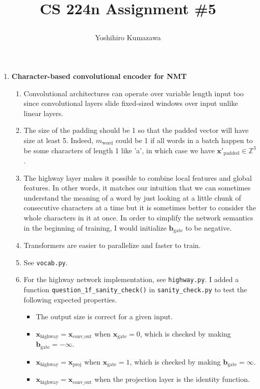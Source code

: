 \documentclass[12pt]{article}
\title{
  \vspace{-2cm}
  CS 224n Assignment \#5 \\
  \author{Yoshihiro Kumazawa}
}
\begin{document}
\maketitle
\begin{enumerate}[label=\textbf{\arabic*.}]
  \item \textbf{Character-based convolutional encoder for NMT}
  \begin{enumerate}[label=(\alph*)]
    \item Convolutional architectures can operate over variable length input too since convolutional layers slide fixed-sized windows over input unlike linear layers.
    \item The size of the padding should be 1 so that the padded vector will have size at least 5. Indeed, $m_\text{word}$ could be 1 if all words in a batch happen to be some characters of length 1 like 'a', in which case we have $\mathbf{x}'_\text{padded}\in\mathbb{Z}^3$.
    \item The highway layer makes it possible to combine local features and global features. In other words, it matches our intuition that we can sometimes understand the meaning of a word by just looking at a little chunk of consecutive characters at a time but it is sometimes better to consider the whole characters in it at once. In order to simplify the network semantics in the beginning of training, I would initialize $\bm{b}_\text{gate}$ to be negative.
    \item Transformers are easier to parallelize and faster to train.
    \item See \texttt{vocab.py}.
    \item For the highway network implementation, see \texttt{highway.py}. I added a function \texttt{question\_1f\_sanity\_check()} in \texttt{sanity\_check.py} to test the following expected properties.
    \begin{itemize}
      \item The output size is correct for a given input.
      \item $\bm{x}_\text{highway}=\bm{x}_\text{conv\_out}$ when $\bm{x}_\text{gate}=0$, which is checked by making $\bm{b}_\text{gate}=-\infty$.
      \item $\bm{x}_\text{highway}=\bm{x}_\text{proj}$ when $\bm{x}_\text{gate}=1$, which is checked by making $\bm{b}_\text{gate}=\infty$.
      \item $\bm{x}_\text{highway}=\bm{x}_\text{conv\_out}$ when the projection layer is the identity function.
    \end{itemize}

\end{enumerate}
\end{enumerate}
\end{document}
